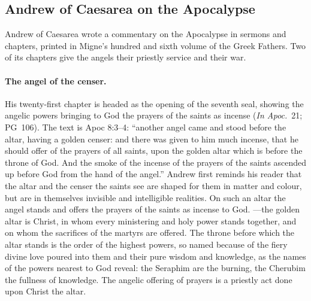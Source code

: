 \sectionguard
\subsection{Andrew of Caesarea on the Apocalypse}\label{sec:bz-andrew}

Andrew of Caesarea wrote a commentary on the Apocalypse in sermons and
chapters, printed in Migne's hundred and sixth volume of the Greek
Fathers. Two of its chapters give the angels their priestly service and
their war.

\paragraph{The angel of the censer.} His twenty-first chapter is headed as the
opening of the seventh seal, showing the angelic powers bringing to God the
prayers of the saints as incense (\emph{In Apoc.}\ 21; PG~106). The text is
Apoc 8:3--4: ``another angel came and stood before the altar, having a
golden censer: and there was given to him much incense, that he should offer
of the prayers of all saints, upon the golden altar which is before the
throne of God. And the smoke of the incense of the prayers of the saints
ascended up before God from the hand of the angel.'' Andrew first reminds
his reader that the altar and the censer the saints see are shaped for them
in matter and colour, but are in themselves invisible and intelligible
realities. On such an altar the angel stands and offers the prayers of the
saints as incense to God. ---the golden
altar is Christ, in whom every ministering and holy power stands together,
and on whom the sacrifices of the martyrs are offered. The throne before
which the altar stands is the order of the highest powers, so named because
of the fiery divine love poured into them and their pure wisdom and
knowledge, as the names of the powers nearest to God reveal: the Seraphim
are the burning, the Cherubim the fullness of knowledge. The angelic
offering of prayers is a priestly act done upon Christ the altar.

